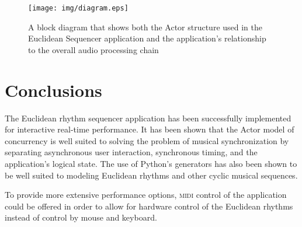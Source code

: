 \documentclass{sig-alternate-05-2015}
\begin{document}
\begin{figure}
\centering
\texttt{[image: img/diagram.eps]}
\caption{A block diagram that shows both the Actor structure used in
the Euclidean Sequencer application and the application's relationship
to the overall audio processing chain}
\label{block-diagram}
\end{figure}

\section{Conclusions}

The Euclidean rhythm sequencer application has been successfully implemented for interactive real-time performance. It has been shown that the Actor model of concurrency is well suited to solving the problem of musical synchronization by separating asynchronous user interaction, synchronous timing, and the application's logical state. The use of Python's generators has also been shown to be well suited to modeling Euclidean rhythms and other cyclic musical sequences.

To provide more extensive performance options, \textsc{midi} control of the application could be offered in order to allow for hardware control of the Euclidean rhythms instead of control by mouse and keyboard. 

%

\end{document}
